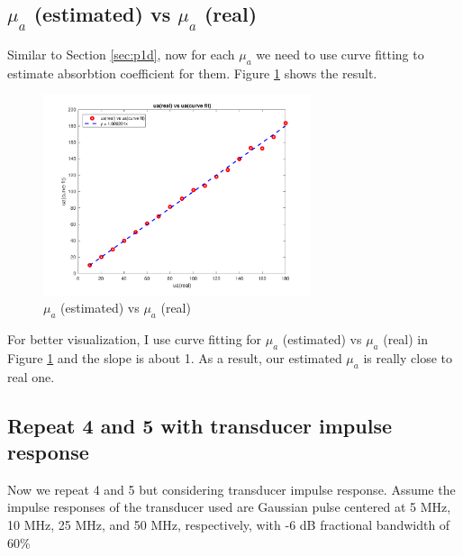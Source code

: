 \documentclass{article}
\begin{document}
\subsection{$\mu_a$ (estimated) vs $\mu_a$ (real)}
Similar to Section \ref{sec:p1d}, now for each $\mu_a$ we need to use curve fitting to estimate absorbtion coefficient for them. 
Figure \ref{fig:p1e} shows the result.
\begin{figure}[H]
    \centering
    \includegraphics[width=0.7\textwidth]{src/p1e.pdf}
    \caption{$\mu_a$ (estimated) vs $\mu_a$ (real)}
    \label{fig:p1e}
\end{figure}
For better visualization, I use curve fitting for $\mu_a$ (estimated) vs $\mu_a$ (real) in Figure \ref{fig:p1e} and the slope 
is about 1. As a result, our estimated $\mu_a$ is really close to real one.

\subsection{Repeat 4 and 5 with transducer impulse response}
Now we repeat 4 and 5 but considering transducer impulse response. Assume the impulse responses of the transducer used are 
Gaussian pulse centered at 5 MHz, 10 MHz, 25 MHz, and 50 MHz, respectively, with -6 dB fractional bandwidth of 60\%
\end{document}
